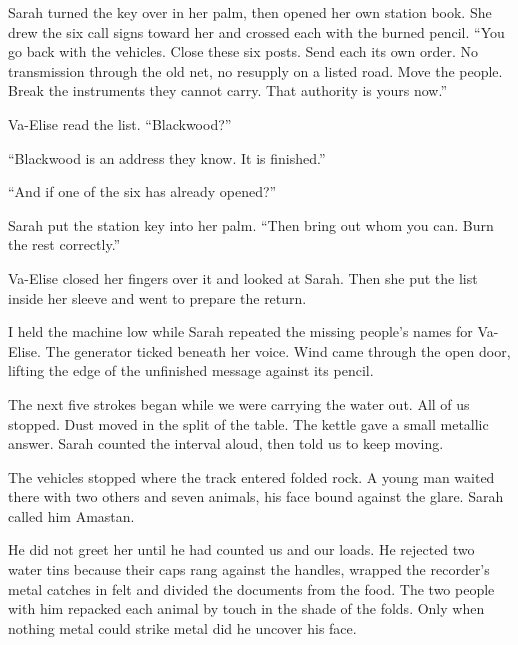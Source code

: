 Sarah turned the key over in her palm, then opened her own station book. She drew the six call signs toward her and crossed each with the burned pencil. ``You go back with the vehicles. Close these six posts. Send each its own order. No transmission through the old net, no resupply on a listed road. Move the people. Break the instruments they cannot carry. That authority is yours now.''\par

Va-Elise read the list. ``Blackwood?''\par

``Blackwood is an address they know. It is finished.''\par

``And if one of the six has already opened?''\par

Sarah put the station key into her palm. ``Then bring out whom you can. Burn the rest correctly.''\par

Va-Elise closed her fingers over it and looked at Sarah. Then she put the list inside her sleeve and went to prepare the return.\par

I held the machine low while Sarah repeated the missing people's names for Va-Elise. The generator ticked beneath her voice. Wind came through the open door, lifting the edge of the unfinished message against its pencil.\par

The next five strokes began while we were carrying the water out. All of us stopped. Dust moved in the split of the table. The kettle gave a small metallic answer. Sarah counted the interval aloud, then told us to keep moving.\par

\ornament

The vehicles stopped where the track entered folded rock. A young man waited there with two others and seven animals, his face bound against the glare. Sarah called him Amastan.\par

He did not greet her until he had counted us and our loads. He rejected two water tins because their caps rang against the handles, wrapped the recorder's metal catches in felt and divided the documents from the food. The two people with him repacked each animal by touch in the shade of the folds. Only when nothing metal could strike metal did he uncover his face.\par


